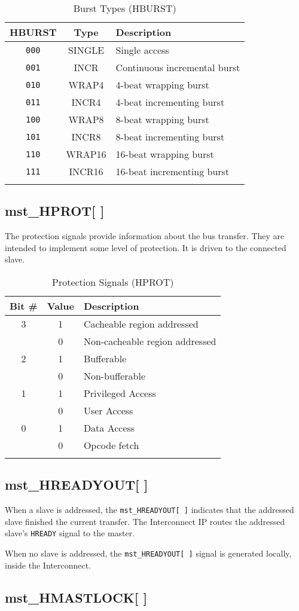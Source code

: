 \begin{longtable}[]{@{}ccl@{}}
\toprule
HBURST & Type & Description\tabularnewline
\midrule
\endhead
\texttt{000} & SINGLE & Single access\tabularnewline
\texttt{001} & INCR & Continuous incremental burst\tabularnewline
\texttt{010} & WRAP4 & 4-beat wrapping burst\tabularnewline
\texttt{011} & INCR4 & 4-beat incrementing burst\tabularnewline
\texttt{100} & WRAP8 & 8-beat wrapping burst\tabularnewline
\texttt{101} & INCR8 & 8-beat incrementing burst\tabularnewline
\texttt{110} & WRAP16 & 16-beat wrapping burst\tabularnewline
\texttt{111} & INCR16 & 16-beat incrementing burst\tabularnewline
\bottomrule
\caption{Burst Types (HBURST)}
\end{longtable}

\subsection{mst\_HPROT[ ]}\label{mst_hprot}

The protection signals provide information about the bus transfer. They
are intended to implement some level of protection. It is driven to the
connected slave.

\begin{longtable}[]{@{}ccl@{}}
\toprule
Bit \# & Value & Description\tabularnewline
\midrule
\endhead
3 & 1 & Cacheable region addressed\tabularnewline
& 0 & Non-cacheable region addressed\tabularnewline
2 & 1 & Bufferable\tabularnewline
& 0 & Non-bufferable\tabularnewline
1 & 1 & Privileged Access\tabularnewline
& 0 & User Access\tabularnewline
0 & 1 & Data Access\tabularnewline
& 0 & Opcode fetch\tabularnewline
\bottomrule
\caption{Protection Signals (HPROT)}
\end{longtable}

\subsection{mst\_HREADYOUT[ ]}\label{mst_hreadyout}

When a slave is addressed, the \texttt{mst\_HREADYOUT[\,]} indicates that the
addressed slave finished the current transfer. The Interconnect IP
routes the addressed slave's \texttt{HREADY} signal to the master.

When no slave is addressed, the \texttt{mst\_HREADYOUT[\,]} signal is generated
locally, inside the Interconnect.

\subsection{mst\_HMASTLOCK[ ]}\label{mst_hmastlock}

